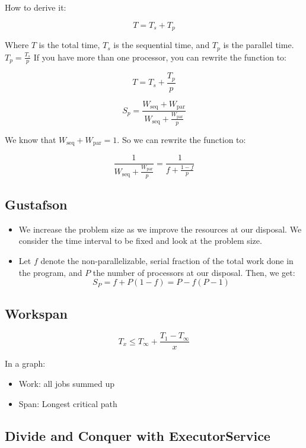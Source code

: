 \documentclass{article}
\begin{document}
How to derive it:

\[T = T_s + T_p\]

Where \(T\) is the total time, \(T_s\) is the sequential time, and \(T_p\) is the parallel time. \(T_p = \frac{T_s}{p}\) If you have more than one processor, you can rewrite the function to:

\[T = T_s + \frac{T_p}{p}\]

\[S_p = \frac{W_{\text{seq}} + W_{\text{par}}}{W_{\text{seq}} + \frac{W_{\text{par}}}{p}}\]

We know that \(W_{\text{seq}} + W_{\text{par}} = 1\). So we can rewrite the function to:

\[\frac{1}{W_{\text{seq}} + \frac{W_{\text{par}}}{p}} = \frac{1}{f + \frac{1-f}{p}}\]

\subsection{Gustafson}

\begin{itemize}
    \item We increase the problem size as we improve the resources at our disposal. We consider the time interval to be fixed and look at the problem size.
    \item Let \(f\) denote the non-parallelizable, serial fraction of the total work done in the program, and \(P\) the number of processors at our disposal. Then, we get:
    \[S_P = f + P(1 - f) = P - f(P - 1)\]
\end{itemize}

\subsection{Workspan}

\[T_x \leq T_\infty + \frac{T_1 - T_\infty}{x}\]

In a graph:

\begin{itemize}
    \item Work: all jobs summed up
    \item Span: Longest critical path
\end{itemize}

\subsection{Divide and Conquer with ExecutorService}
\end{document}
